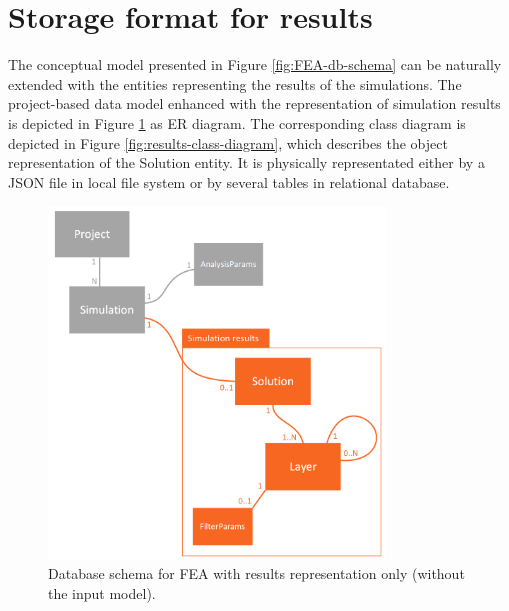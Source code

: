 
\section{Storage format for results}
\label{sec:storage-format}


The conceptual model presented in Figure \ref{fig:FEA-db-schema} can be naturally extended with the entities representing the results of the simulations. The project-based data model enhanced with the representation of simulation results is depicted in Figure \ref{fig:FEA-db-schema-results} as ER diagram. The corresponding class diagram is depicted in Figure \ref{fig:results-class-diagram}, which describes the object representation of the Solution entity. It is physically representated either by a JSON file in local file system or by several tables in relational database.

\begin{figure}[H]
    \centering
    \includegraphics[width=0.8\textwidth]{figures/chapter-data-management/FEA-database-schema-only-results}
    \decoRule
    \caption[Database schema for FEA with results representation only]{Database schema for FEA with results representation only (without the input model).}
    \label{fig:FEA-db-schema-results}
\end{figure}

